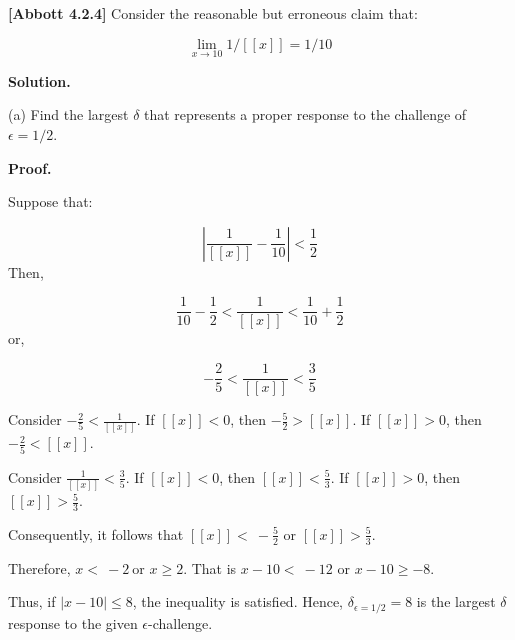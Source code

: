 \documentclass[10pt]{article}
\begin{document}
\textbf{[Abbott 4.2.4]} Consider the reasonable but erroneous claim that:


\begin{equation*}
\lim _{x\rightarrow 10} 1/[[ x]] =1/10
\end{equation*}


\textbf{Solution.}



(a) Find the largest $\displaystyle \delta $ that represents a proper response to the challenge of \ $\displaystyle \epsilon =1/2$.



\textbf{Proof.}



Suppose that:


\begin{equation*}
\left| \frac{1}{[[ x]]} -\frac{1}{10}\right| < \frac{1}{2}
\end{equation*}
Then,




\begin{equation*}
\frac{1}{10} -\frac{1}{2} < \frac{1}{[[ x]]} < \frac{1}{10} +\frac{1}{2}
\end{equation*}
or,




\begin{equation*}
-\frac{2}{5} < \frac{1}{[[ x]]} < \frac{3}{5}
\end{equation*}


Consider $\displaystyle -\frac{2}{5} < \frac{1}{[[ x]]}$. If $\displaystyle [[ x]] < 0$, then $\displaystyle -\frac{5}{2}  >[[ x]]$. If $\displaystyle [[ x]]  >0$, then $\displaystyle -\frac{2}{5} < [[ x]]$. 



Consider $\displaystyle \frac{1}{[[ x]]} < \frac{3}{5}$. If $\displaystyle [[ x]] < 0$, then $\displaystyle [[ x]] < \frac{5}{3}$. If $\displaystyle [[ x]]  >0$, then $\displaystyle [[ x]]  >\frac{5}{3}$. $ $



Consequently, it follows that $\displaystyle [[ x]] < \ -\frac{5}{2}$ or $\displaystyle [[ x]]  >\frac{5}{3}$. 



Therefore, $\displaystyle x< \ -2\ $or $\displaystyle x\geq 2$. That is $\displaystyle x-10< \ -12$ or $\displaystyle x-10\geq -8$. 



Thus, if $\displaystyle |x-10|\leq 8$, the inequality is satisfied. Hence, $\displaystyle \delta _{\epsilon =1/2} =8$ is the largest $\displaystyle \delta $ response to the given $\displaystyle \epsilon $-challenge.
\end{document}
